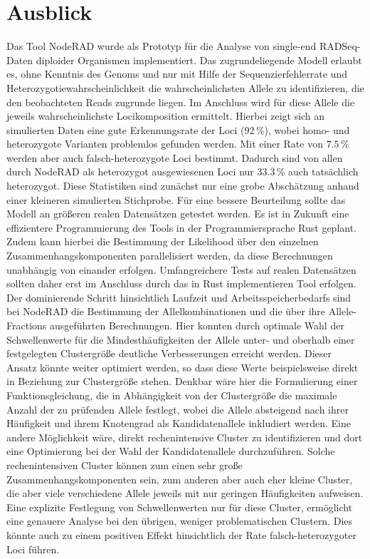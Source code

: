 \chapter{Ausblick} \label{sec:ausblick}

Das Tool NodeRAD \cite{noderad} wurde als Prototyp für die Analyse von single-end RADSeq-Daten diploider Organismen implementiert. Das zugrundeliegende Modell erlaubt es, ohne Kenntnis des Genoms und nur mit Hilfe der Sequenzierfehlerrate und Heterozygotiewahrscheinlichkeit die wahrscheinlichsten Allele zu identifizieren, die den beobachteten Reads zugrunde liegen. Im Anschluss wird für diese Allele die jeweils wahrscheinlichste Locikomposition ermittelt. Hierbei zeigt sich an simulierten Daten eine gute Erkennungsrate der Loci ($ 92\, \% $), wobei homo- und heterozygote Varianten problemlos gefunden werden. Mit einer Rate von $ 7.5\, \% $ werden aber auch falsch-heterozygote Loci bestimmt. Dadurch sind von allen durch NodeRAD als heterozygot ausgewiesenen Loci nur $ 33.\overline{3}\, \% $ auch tatsächlich heterozygot. Diese Statistiken sind zunächst nur eine grobe Abschätzung anhand einer kleineren simulierten Stichprobe. Für eine bessere Beurteilung sollte das Modell an größeren realen Datensätzen getestet werden. Es ist in Zukunft eine effizientere Programmierung des Tools in der Programmiersprache Rust geplant. Zudem kann hierbei die Bestimmung der Likelihood über den einzelnen Zusammenhangskomponenten parallelisiert werden, da diese Berechnungen unabhängig von einander erfolgen. Umfangreichere Tests auf realen Datensätzen sollten daher erst im Anschluss durch das in Rust implementieren Tool erfolgen. \\

Der dominierende Schritt hinsichtlich Laufzeit und Arbeitsspeicherbedarfs sind bei NodeRAD die Bestimmung der Allelkombinationen und die über ihre Allele-Fractions ausgeführten Berechnungen. Hier konnten durch optimale Wahl der Schwellenwerte für die Mindesthäufigkeiten der Allele unter- und oberhalb einer festgelegten Clustergröße deutliche Verbesserungen erreicht werden. Dieser Ansatz könnte weiter optimiert werden, so dass diese Werte beispielsweise direkt in Beziehung zur Clustergröße stehen. Denkbar wäre hier die Formulierung einer Funktionsgleichung, die in Abhängigkeit von der Clustergröße die maximale Anzahl der zu prüfenden Allele festlegt, wobei die Allele absteigend nach ihrer Häufigkeit und ihrem Knotengrad als Kandidatenallele inkludiert werden. Eine andere Möglichkeit wäre, direkt rechenintensive Cluster zu identifizieren und dort eine Optimierung bei der Wahl der Kandidatenallele durchzuführen. Solche rechenintensiven Cluster können zum einen sehr große Zusammenhangskomponenten sein, zum anderen aber auch eher kleine Cluster, die aber viele verschiedene Allele jeweils mit nur geringen Häufigkeiten aufweisen. Eine explizite Festlegung von Schwellenwerten nur für diese Cluster, ermöglicht eine genauere Analyse bei den übrigen, weniger problematischen Clustern. Dies könnte auch zu einem positiven Effekt hinsichtlich der Rate falsch-heterozygoter Loci führen. \\

